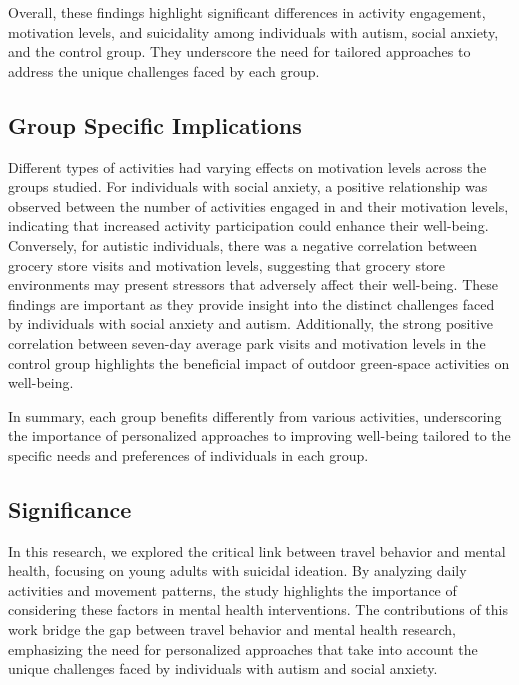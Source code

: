 \documentclass[
  letterpaper,
  number,
  review,
  3p]{elsarticle}
\begin{document}
Overall, these findings highlight significant differences in activity
engagement, motivation levels, and suicidality among individuals with
autism, social anxiety, and the control group. They underscore the need
for tailored approaches to address the unique challenges faced by each
group.

\subsection{Group Specific
Implications}\label{group-specific-implications}

Different types of activities had varying effects on motivation levels
across the groups studied. For individuals with social anxiety, a
positive relationship was observed between the number of activities
engaged in and their motivation levels, indicating that increased
activity participation could enhance their well-being. Conversely, for
autistic individuals, there was a negative correlation between grocery
store visits and motivation levels, suggesting that grocery store
environments may present stressors that adversely affect their
well-being. These findings are important as they provide insight into
the distinct challenges faced by individuals with social anxiety and
autism. Additionally, the strong positive correlation between seven-day
average park visits and motivation levels in the control group
highlights the beneficial impact of outdoor green-space activities on
well-being.

In summary, each group benefits differently from various activities,
underscoring the importance of personalized approaches to improving
well-being tailored to the specific needs and preferences of individuals
in each group.

\subsection{Significance}\label{significance}

In this research, we explored the critical link between travel behavior
and mental health, focusing on young adults with suicidal ideation. By
analyzing daily activities and movement patterns, the study highlights
the importance of considering these factors in mental health
interventions. The contributions of this work bridge the gap between
travel behavior and mental health research, emphasizing the need for
personalized approaches that take into account the unique challenges
faced by individuals with autism and social anxiety.
\end{document}

